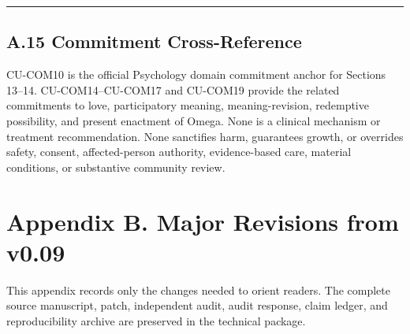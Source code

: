 \documentclass[
  11pt,
]{article}
\begin{document}
\begin{center}\rule{0.5\linewidth}{0.5pt}\end{center}

\subsection{A.15 Commitment
Cross-Reference}\label{a.15-commitment-cross-reference}

CU-COM10 is the official Psychology domain commitment anchor for
Sections 13--14. CU-COM14--CU-COM17 and CU-COM19 provide the related
commitments to love, participatory meaning, meaning-revision, redemptive
possibility, and present enactment of Omega. None is a clinical
mechanism or treatment recommendation. None sanctifies harm, guarantees
growth, or overrides safety, consent, affected-person authority,
evidence-based care, material conditions, or substantive community
review.

\section{Appendix B. Major Revisions from
v0.09}\label{appendix-b.-major-revisions-from-v0.09}

This appendix records only the changes needed to orient readers. The
complete source manuscript, patch, independent audit, audit response,
claim ledger, and reproducibility archive are preserved in the technical
package.
\end{document}
